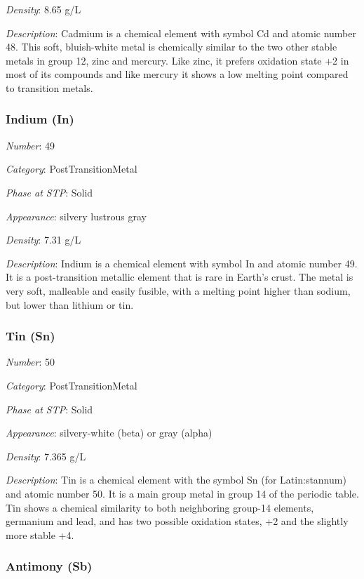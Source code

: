 \documentclass{article}
\begin{document}
\textit{Density}: 8.65 g/L

\textit{Description}: Cadmium is a chemical element with symbol Cd and atomic number 48. This soft, bluish-white metal is chemically similar to the two other stable metals in group 12, zinc and mercury. Like zinc, it prefers oxidation state +2 in most of its compounds and like mercury it shows a low melting point compared to transition metals.

\hypertarget{subsubsection::In}{}\subsubsection{Indium (In)}

\textit{Number}: 49

\textit{Category}: PostTransitionMetal

\textit{Phase at STP}: Solid

\textit{Appearance}: silvery lustrous gray

\textit{Density}: 7.31 g/L

\textit{Description}: Indium is a chemical element with symbol In and atomic number 49. It is a post-transition metallic element that is rare in Earth's crust. The metal is very soft, malleable and easily fusible, with a melting point higher than sodium, but lower than lithium or tin.

\hypertarget{subsubsection::Sn}{}\subsubsection{Tin (Sn)}

\textit{Number}: 50

\textit{Category}: PostTransitionMetal

\textit{Phase at STP}: Solid

\textit{Appearance}: silvery-white (beta) or gray (alpha)

\textit{Density}: 7.365 g/L

\textit{Description}: Tin is a chemical element with the symbol Sn (for Latin:stannum) and atomic number 50. It is a main group metal in group 14 of the periodic table. Tin shows a chemical similarity to both neighboring group-14 elements, germanium and lead, and has two possible oxidation states, +2 and the slightly more stable +4.

\hypertarget{subsubsection::Sb}{}\subsubsection{Antimony (Sb)}
\end{document}
